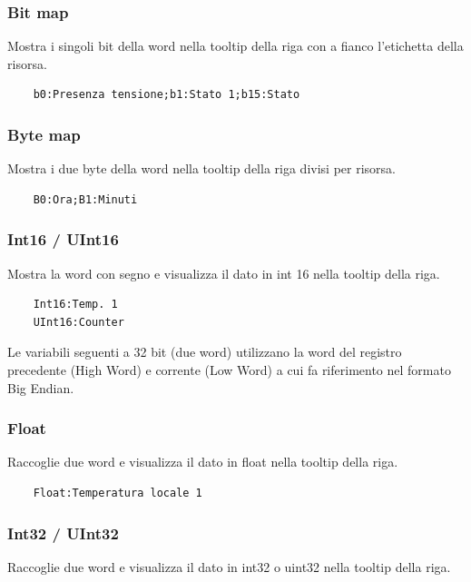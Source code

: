 \subsubsection{Bit map}

Mostra i singoli bit della word nella tooltip della riga con a fianco l'etichetta della risorsa.

\begin{verbatim}
    b0:Presenza tensione;b1:Stato 1;b15:Stato
\end{verbatim}

\subsubsection{Byte map}

Mostra i due byte della word nella tooltip della riga divisi per risorsa.

\begin{verbatim}
    B0:Ora;B1:Minuti
\end{verbatim}

\subsubsection{Int16 / UInt16}

Mostra la word con segno e visualizza il dato in int 16 nella tooltip della riga.

\begin{verbatim}
    Int16:Temp. 1
    UInt16:Counter
\end{verbatim}

Le variabili seguenti a 32 bit (due word) utilizzano la word del registro precedente (High Word) e
corrente (Low Word) a cui fa riferimento nel formato Big Endian.

\subsubsection{Float}

Raccoglie due word e visualizza il dato in float nella tooltip della riga.

\begin{verbatim}
    Float:Temperatura locale 1
\end{verbatim}

\subsubsection{Int32 / UInt32}

Raccoglie due word e visualizza il dato in int32 o uint32 nella tooltip della riga.

